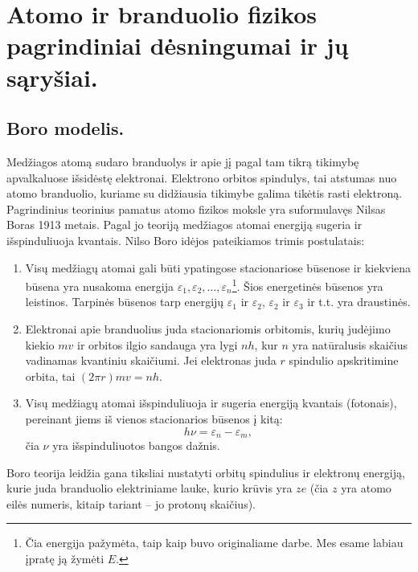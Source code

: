 \chapter{Atomo ir branduolio fizikos pagrindiniai dėsningumai ir jų
sąryšiai.}


\section{Boro modelis.}

Medžiagos atomą sudaro branduolys ir apie jį pagal tam tikrą tikimybę
apvalkaluose išsidėstę elektronai. Elektrono orbitos spindulys, tai
atstumas nuo atomo branduolio, kuriame su didžiausia tikimybe galima
tikėtis rasti elektroną. Pagrindinius teorinius pamatus atomo fizikos
moksle yra suformulavęs Nilsas Boras 1913 metais. Pagal jo teoriją
medžiagos atomai energiją sugeria ir išspinduliuoja kvantais. Nilso
Boro idėjos pateikiamos trimis postulatais:
\begin{enumerate}
  \item {} Visų medžiagų atomai gali
    būti ypatingose stacionariose būsenose ir kiekviena būsena yra
    nusakoma energija
    $\varepsilon_{1}, \varepsilon_{2}, \ldots, \varepsilon_{n}$\footnote{
    Čia energija pažymėta, taip kaip buvo originaliame darbe. Mes
    esame labiau įpratę ją žymėti $E$.}. Šios energetinės būsenos
    yra leistinos. Tarpinės būsenos tarp energijų $\varepsilon_{1}$ ir
    $\varepsilon_{2}$, $\varepsilon_{2}$ ir $\varepsilon_{3}$ ir t.t.
    yra draustinės.
  \item {} Elektronai apie branduolius
    juda stacionariomis orbitomis, kurių judėjimo kiekio $mv$ ir
    orbitos ilgio sandauga yra lygi $nh$, kur $n$ yra natūralusis
    skaičius vadinamas kvantiniu skaičiumi. Jei elektronas juda
    $r$ spindulio apskritimine orbita, tai $(2 \pi r) m v = nh$.
  \item {} Visų medžiagų atomai išspinduliuoja
    ir sugeria energiją kvantais (fotonais), pereinant jiems iš
    vienos stacionarios būsenos į kitą:
    \begin{equation*}
      h \nu = \varepsilon_{n} - \varepsilon_{m},
    \end{equation*}
    čia $\nu$ yra išspinduliuotos bangos dažnis.
\end{enumerate}

Boro teorija leidžia gana tiksliai nustatyti orbitų spindulius ir
elektronų energiją, kurie juda branduolio elektriniame lauke,
kurio krūvis yra $ze$ (čia $z$ yra atomo eilės numeris, kitaip
tariant – jo protonų skaičius).

